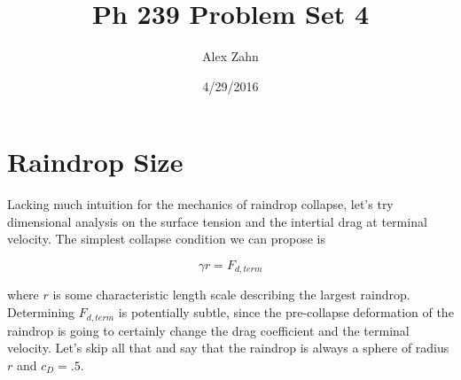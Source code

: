 \documentclass[12pt]{article}
\title{Ph 239 Problem Set 4}
\author{Alex Zahn}
\date{4/29/2016}
\begin{document}
\maketitle

\newcommand{\wmsq}{W/\(\mathrm{m}^2\,\)}
\newcommand{\msq}{\(\mathrm{m}^2\,\)}
\newcommand{\micron}{\(\mu\mathrm{m}\)\,}
\newcommand{\mcb}{\(\mathrm{m}^3\,\)}

\section{Raindrop Size}

Lacking much intuition for the mechanics of raindrop collapse, let's try dimensional analysis on the surface tension and the intertial drag at terminal velocity. The simplest collapse condition we can propose is 

\[ \gamma r = F_{d,term}
\]

where \(r\) is some characteristic length scale describing the largest raindrop. Determining \(F_{d,term}\) is potentially subtle, since the pre-collapse deformation of the raindrop is going to certainly change the drag coefficient and the terminal velocity. Let's skip all that and say that the raindrop is always a sphere of radius \(r\) and \(c_D = .5\).
\end{document}
